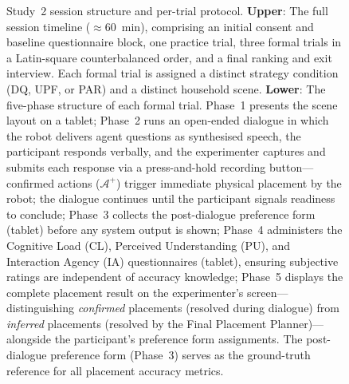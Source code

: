 \documentclass[manuscript,review,anonymous]{acmart}
\begin{document}
\begin{figure}[t]
  \caption{Study~2 session structure and per-trial protocol. \textbf{Upper}: The full session timeline ($\approx$60~min), comprising an initial consent and baseline questionnaire block, one practice trial, three formal trials in a Latin-square counterbalanced order, and a final ranking and exit interview. Each formal trial is assigned a distinct strategy condition (DQ, UPF, or PAR) and a distinct household scene. \textbf{Lower}: The five-phase structure of each formal trial. Phase~1 presents the scene layout on a tablet; Phase~2 runs an open-ended dialogue in which the robot delivers agent questions as synthesised speech, the participant responds verbally, and the experimenter captures and submits each response via a press-and-hold recording button---confirmed actions ($\mathcal{A}^+$) trigger immediate physical placement by the robot; the dialogue continues until the participant signals readiness to conclude; Phase~3 collects the post-dialogue preference form (tablet) before any system output is shown; Phase~4 administers the Cognitive Load (CL), Perceived Understanding (PU), and Interaction Agency (IA) questionnaires (tablet), ensuring subjective ratings are independent of accuracy knowledge; Phase~5 displays the complete placement result on the experimenter's screen---distinguishing \textit{confirmed} placements (resolved during dialogue) from \textit{inferred} placements (resolved by the Final Placement Planner)---alongside the participant's preference form assignments. The post-dialogue preference form (Phase~3) serves as the ground-truth reference for all placement accuracy metrics.}
  \label{fig:study2-procedure}
\end{figure}
\end{document}
